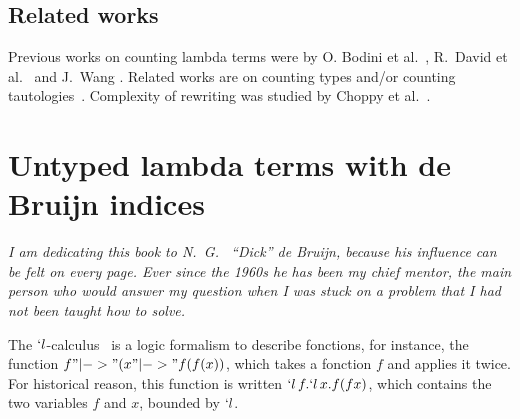 \documentclass[preprint,authoryear]{elsarticle}
\begin{document}
\subsection*{Related works}

Previous works on counting lambda terms were by O. Bodini et
al.~\cite{bodini11:_lambd_bound_unary_heigh}, R.~David et
al.~\cite{DBLP:journals/corr/abs-0903-5505} and J.~Wang \cite{Wang05generatingrandom}.
Related works are on counting types and/or counting
tautologies~\cite{DBLP:journals/tcs/Zaionc06,DBLP:conf/csl/FournierGGZ07,DBLP:journals/aml/DavidZ09,DBLP:journals/mlq/FournierGGZ10}. Complexity of rewriting was studied by Choppy et
al.~\cite{ChristineChoppyKS-TCS89}.


\section{Untyped lambda terms with de Bruijn indices}
\label{sec:lambda-terms-with}

\hfill\parbox{10cm}{\it I am dedicating this book to N.~G.~ ``Dick'' de Bruijn, because his
  influence can be felt on every page. Ever since the 1960s he has been my chief mentor,
  the main person who would answer my question when I was stuck on a problem that I had not
  been taught how to solve.
}

\medskip

\medskip

The $`l$-calculus~\cite{HBarendregt84} is a logic formalism to describe fonctions, for
instance, the function $f "|->" (x "|->" f (f (x))$, which takes a fonction $f$ and
applies it twice.  For historical reason, this function is written $`l\,f . `l\,x. f (f
x)$, which contains the two variables $f$ and $x$, bounded by $`l$.
\end{document}
